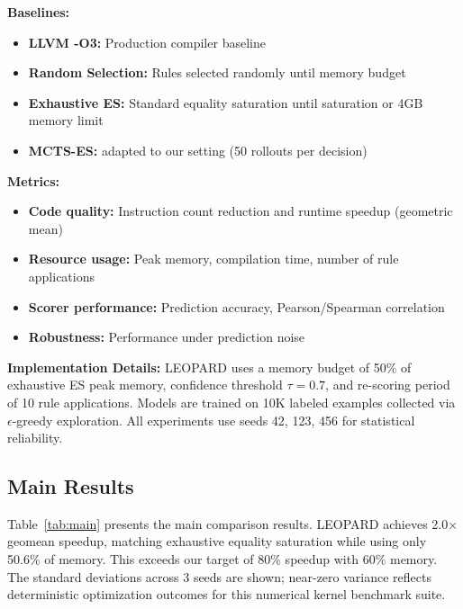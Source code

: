 \documentclass{article}
\begin{document}
\textbf{Baselines:}
\begin{itemize}
    \item \textbf{LLVM -O3:} Production compiler baseline
    \item \textbf{Random Selection:} Rules selected randomly until memory budget
    \item \textbf{Exhaustive ES:} Standard equality saturation until saturation or 4GB memory limit
    \item \textbf{MCTS-ES:} \citet{hartmann2024optimizing} adapted to our setting (50 rollouts per decision)
\end{itemize}

\textbf{Metrics:}
\begin{itemize}
    \item \textbf{Code quality:} Instruction count reduction and runtime speedup (geometric mean)
    \item \textbf{Resource usage:} Peak memory, compilation time, number of rule applications
    \item \textbf{Scorer performance:} Prediction accuracy, Pearson/Spearman correlation
    \item \textbf{Robustness:} Performance under prediction noise
\end{itemize}

\textbf{Implementation Details:} LEOPARD uses a memory budget of 50\% of exhaustive ES peak memory, confidence threshold $\tau = 0.7$, and re-scoring period of 10 rule applications. Models are trained on 10K labeled examples collected via $\epsilon$-greedy exploration. All experiments use seeds 42, 123, 456 for statistical reliability.

\subsection{Main Results}

Table~\ref{tab:main} presents the main comparison results. LEOPARD achieves 2.0$\times$ geomean speedup, matching exhaustive equality saturation while using only 50.6\% of memory. This exceeds our target of 80\% speedup with 60\% memory. The standard deviations across 3 seeds are shown; near-zero variance reflects deterministic optimization outcomes for this numerical kernel benchmark suite.
\end{document}
